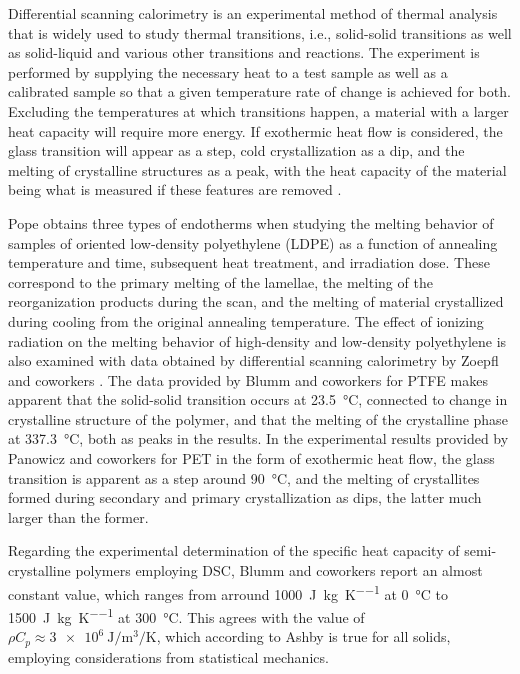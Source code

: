 Differential scanning calorimetry is an experimental method of thermal analysis that is widely used to study thermal transitions, i.e., solid-solid transitions as well as solid-liquid and various other transitions and reactions.
The experiment is performed by supplying the necessary heat to a test sample as well as a calibrated sample so that a given temperature rate of change is achieved for both.
Excluding the temperatures at which transitions happen, a material with a larger heat capacity will require more energy.
If exothermic heat flow is considered, the glass transition will appear as a step, cold crystallization as a dip, and the melting of crystalline structures as a peak, with the heat capacity of the material being what is measured if these features are removed \citep{lukasDifferentialScanningCalorimetry2009}.

Pope \citep{popeCharacterizationOrientedLowdensity1976} obtains three types of endotherms when studying the melting behavior of samples of oriented low-density polyethylene (LDPE) as a function of annealing temperature and time, subsequent heat treatment, and irradiation dose.
These correspond to the primary melting of the lamellae, the melting of the reorganization products during the scan, and the melting of material crystallized during cooling from the original annealing temperature.
The effect of ionizing radiation on the melting behavior of high-density and low-density
polyethylene is also examined with data obtained by differential scanning calorimetry by Zoepfl and coworkers \citep{zoepflDifferentialScanningCalorimetry1984}.
The data provided by Blumm and coworkers \citep{blummCharacterizationPTFEUsing2010} for PTFE makes apparent that the solid-solid transition occurs at \SI{23.5}{\celsius}, connected to change in crystalline structure of the polymer, and that the melting of the crystalline phase at \SI{337.3}{\celsius}, both as peaks in the results.
In the experimental results provided by Panowicz and coworkers \citep{panowiczPropertiesPolyethyleneTerephthalate2021} for PET in the form of exothermic heat flow, the glass transition is apparent as a step around \SI{90}{\celsius}, and the melting of crystallites formed during secondary and primary crystallization as dips, the latter much larger than the former.

Regarding the experimental determination of the specific heat capacity of semi-crystalline polymers employing DSC, Blumm and coworkers \citep{blummCharacterizationPTFEUsing2010} report an almost constant value, which ranges from arround \SI{1000}{\joule\per\kilo\gram\per\kelvin} at \SI{0}{\celsius} to \SI{1500}{\joule\per\kilo\gram\per\kelvin} at \SI{300}{\celsius}.
This agrees with the value of $\rho C_p \approx \SI{3e6}{\joule\per\meter\cubed\per\kelvin}$, which according to Ashby \citep{ashbyMaterialsSelectionMechanical1999} is true for all solids, employing considerations from statistical mechanics.

